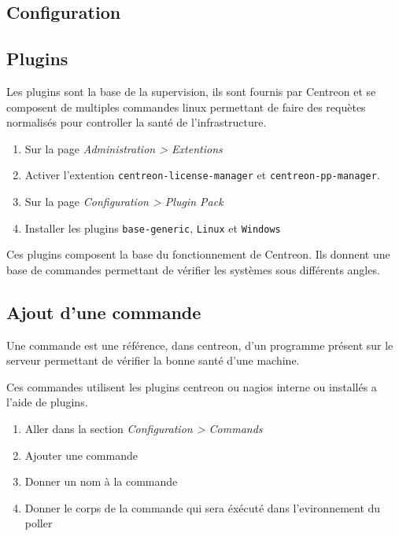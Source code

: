 	\subsection{Configuration}

		\subsection{Plugins}

		Les plugins sont la base de la supervision, ils sont fournis par Centreon et se composent de multiples commandes linux permettant de faire des requètes normalisés pour controller la santé de l'infrastructure.

		\begin{enumerate}
			\item Sur la page \emph{Administration > Extentions}
			\item Activer l'extention \texttt{centreon-license-manager} et \texttt{centreon-pp-manager}.
			\item Sur la page \emph{Configuration > Plugin Pack}
			\item Installer les plugins \texttt{base-generic}, \texttt{Linux} et \texttt{Windows}
		\end{enumerate}

		Ces plugins composent la base du fonctionnement de Centreon.
		Ils donnent une base de commandes permettant de vérifier les systèmes sous différents angles.

		\subsection{Ajout d'une commande}

		Une commande est une référence, dans centreon, d'un programme présent sur le serveur permettant de vérifier la bonne santé d'une machine.

		Ces commandes utilisent les plugins centreon ou nagios interne ou installés a l'aide de plugins.

		\begin{enumerate}
			\item Aller dans la section \emph{Configuration > Commands}
			\item Ajouter une commande
			\item Donner un nom à la commande
			\item Donner le corps de la commande qui sera éxécuté dans l'evironnement du poller
		\end{enumerate}

